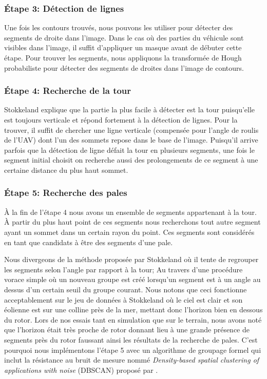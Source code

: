 \subsubsection{Étape 3: Détection de lignes}

Une fois les contours trouvés, nous pouvons les utiliser pour détecter des segments de droite dans l'image. Dans le cas où des parties du véhicule sont visibles dans l'image, il suffit d'appliquer un masque avant de débuter cette étape. Pour trouver les segments, nous appliquons la transformée de Hough probabiliste pour détecter des segments de droites dans l'image de contours.

\subsubsection{Étape 4: Recherche de la tour}
\label{subsubsec:approach4}

Stokkeland explique que la partie la plus facile à détecter est la tour puisqu'elle est toujours verticale et répond fortement à la détection de lignes. Pour la trouver, il suffit de chercher une ligne verticale (compensée pour l'angle de roulis de l'UAV) dont l'un des sommets repose dans le base de l'image. Puisqu'il arrive parfois que la détection de ligne défait la tour en plusieurs segments, une fois le segment initial choisit on recherche aussi des prolongements de ce segment à une certaine distance du plus haut sommet.

\subsubsection{Étape 5: Recherche des pales}

À la fin de l'étape 4 nous avons un ensemble de segments appartenant à la tour. À partir du plus haut point de ces segments nous recherchons tout autre segment ayant un sommet dans un certain rayon du point. Ces segments sont considérés en tant que candidats à être des segments d'une pale.

Nous divergeons de la méthode proposée par Stokkeland où il tente de regrouper les segments selon l'angle par rapport à la tour; Au travers d'une procédure vorace simple où un nouveau groupe est créé lorsqu'un segment est à un angle au dessus d'un certain seuil du groupe courant. Nous notons que ceci fonctionne acceptablement sur le jeu de données à Stokkeland où le ciel est clair et son éolienne est sur une colline près de la mer, mettant donc l'horizon bien en dessous du rotor. Lors de nos essais tant en simulation que sur le terrain, nous avons noté que l'horizon était très proche de rotor donnant lieu à une grande présence de segments près du rotor faussant ainsi les résultats de la recherche de pales. C'est pourquoi nous implémentons l'étape 5 avec un algorithme de groupage formel qui inclut la résistance au bruit de mesure nommé \textit{Density-based spatial clustering of applications with noise} (DBSCAN) proposé par \citep{Ester1996}.

